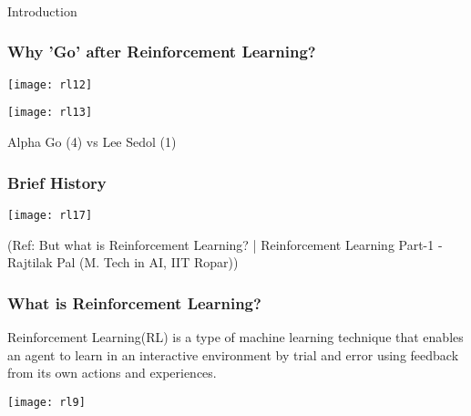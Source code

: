 \begin{frame}[fragile]\frametitle{}
\begin{center}
{\Large Introduction}
\end{center}
\end{frame}

\begin{frame}[fragile]\frametitle{Why 'Go' after Reinforcement Learning?}

\begin{center}
\texttt{[image: rl12]}

\texttt{[image: rl13]}

Alpha Go (4) vs Lee Sedol (1)
\end{center}

\end{frame}

\begin{frame}[fragile]\frametitle{Brief History}

\begin{center}
\texttt{[image: rl17]}
\end{center}

{\tiny (Ref: But what is Reinforcement Learning? | Reinforcement Learning Part-1 - Rajtilak Pal (M. Tech in AI, IIT Ropar))}
\end{frame}


\begin{frame}[fragile]\frametitle{What is Reinforcement Learning?}
Reinforcement Learning(RL) is a type of machine learning technique that enables an agent to learn in an interactive environment by trial and error using feedback from its own actions and experiences.

\begin{center}
\texttt{[image: rl9]}
\end{center}


\end{frame}

